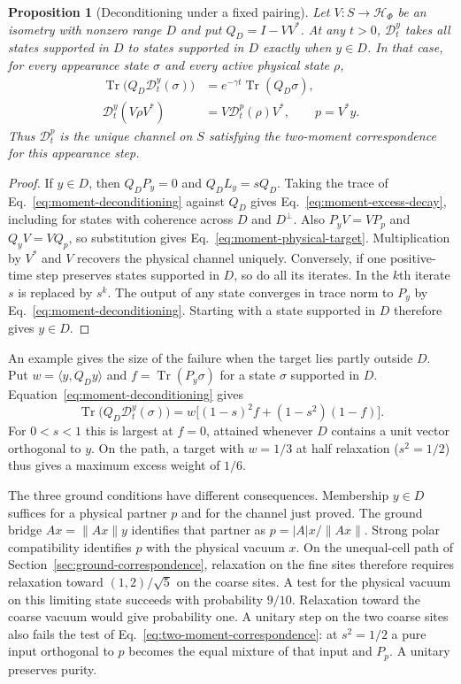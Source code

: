 \documentclass[11pt]{article}
\newtheorem{proposition}{Proposition}[section]
\theoremstyle{definition}
\DeclareMathOperator{\Tr}{Tr}
\begin{document}
\begin{proposition}[Deconditioning under a fixed pairing]
\label{prop:two-moment-deconditioning}
Let $V:S\to\mathcal H_\Phi$ be an isometry with nonzero range $D$ and put $Q_D=I-VV^*$. At any $t>0$, $\mathcal D_t^y$ takes all states supported in $D$ to states supported in $D$ exactly when $y\in D$. In that case, for every appearance state $\sigma$ and every active physical state $\rho$,
\begin{align}
 \Tr\bigl(Q_D\mathcal D_t^y(\sigma)\bigr)
    &=e^{-\gamma t}\Tr(Q_D\sigma), \label{eq:moment-excess-decay}\\
 \mathcal D_t^y(V\rho V^*)&=V\mathcal D_t^{p}(\rho)V^*,
       \qquad p=V^*y . \label{eq:moment-physical-target}
\end{align}
Thus $\mathcal D_t^{p}$ is the unique channel on $S$ satisfying the two-moment correspondence for this appearance step.
\end{proposition}
\begin{proof}
If $y\in D$, then $Q_D P_y=0$ and $Q_D L_y=sQ_D$. Taking the trace of Eq.~\eqref{eq:moment-deconditioning} against $Q_D$ gives Eq.~\eqref{eq:moment-excess-decay}, including for states with coherence across $D$ and $D^\perp$. Also $P_yV=VP_p$ and $Q_yV=VQ_p$, so substitution gives Eq.~\eqref{eq:moment-physical-target}. Multiplication by $V^*$ and $V$ recovers the physical channel uniquely. Conversely, if one positive-time step preserves states supported in $D$, so do all its iterates. In the $k$th iterate $s$ is replaced by $s^k$. The output of any state converges in trace norm to $P_y$ by Eq.~\eqref{eq:moment-deconditioning}. Starting with a state supported in $D$ therefore gives $y\in D$.
\end{proof}

An example gives the size of the failure when the target lies partly outside $D$. Put $w=\langle y,Q_D y\rangle$ and $f=\Tr(P_y\sigma)$ for a state $\sigma$ supported in $D$. Equation~\eqref{eq:moment-deconditioning} gives
\[
 \Tr\bigl(Q_D\mathcal D_t^y(\sigma)\bigr)
 =w\bigl[(1-s)^2 f+(1-s^2)(1-f)\bigr].
\]
For $0<s<1$ this is largest at $f=0$, attained whenever $D$ contains a unit vector orthogonal to $y$. On the path, a target with $w=1/3$ at half relaxation ($s^2=1/2$) thus gives a maximum excess weight of $1/6$.

The three ground conditions have different consequences. Membership $y\in D$ suffices for a physical partner $p$ and for the channel just proved. The ground bridge $Ax=\|Ax\|y$ identifies that partner as $p=|A|x/\|Ax\|$. Strong polar compatibility identifies $p$ with the physical vacuum $x$. On the unequal-cell path of Section~\ref{sec:ground-correspondence}, relaxation on the fine sites therefore requires relaxation toward $(1,2)/\sqrt5$ on the coarse sites. A test for the physical vacuum on this limiting state succeeds with probability $9/10$. Relaxation toward the coarse vacuum would give probability one. A unitary step on the two coarse sites also fails the test of Eq.~\eqref{eq:two-moment-correspondence}: at $s^2=1/2$ a pure input orthogonal to $p$ becomes the equal mixture of that input and $P_p$. A unitary preserves purity.
\end{document}

